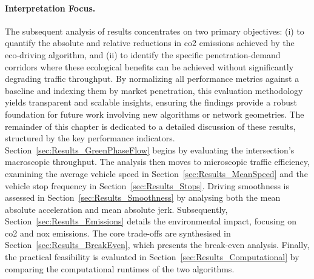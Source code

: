 \paragraph{Interpretation Focus.}
The subsequent analysis of results concentrates on two primary objectives: (i) to quantify the absolute and relative reductions in \ac{co2} emissions achieved by the eco-driving algorithm, and (ii) to identify the specific penetration-demand corridors where these ecological benefits can be achieved without significantly degrading traffic throughput. By normalizing all performance metrics against a baseline and indexing them by market penetration, this evaluation methodology yields transparent and scalable insights, ensuring the findings provide a robust foundation for future work involving new algorithms or network geometries.
\mynewline
The remainder of this chapter is dedicated to a detailed discussion of these results, structured by the key performance indicators. Section~\vref{sec:Results_GreenPhaseFlow} begins by evaluating the intersection's macroscopic throughput. The analysis then moves to microscopic traffic efficiency, examining the average vehicle speed in Section~\vref{sec:Results_MeanSpeed} and the vehicle stop frequency in Section~\vref{sec:Results_Stops}. Driving smoothness is assessed in Section~\vref{sec:Results_Smoothness} by analysing both the mean absolute acceleration and mean absolute jerk. Subsequently, Section~\vref{sec:Results_Emissions} details the environmental impact, focusing on \ac{co2} and \ac{nox} emissions. The core trade-offs are synthesised in Section~\vref{sec:Results_BreakEven}, which presents the break-even analysis. Finally, the practical feasibility is evaluated in Section~\vref{sec:Results_Computational} by comparing the computational runtimes of the two algorithms.

